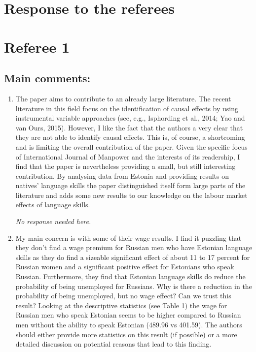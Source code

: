 \documentclass{article}
\newenvironment{response}
{\slshape}{}
\begin{document}
\section*{Response to the referees}

\section{Referee 1}

\subsection{Main comments:}


\begin{enumerate}
\item The paper aims to contribute to an already large
  literature. The recent literature in this field focus on the
  identification of causal effects by using instrumental variable
  approaches (see, e.g., Isphording et al., 2014; Yao and van Ours,
  2015). However, I like the fact that the authors a very clear that
  they are not able to identify causal effects. This is, of course, a
  shortcoming and is limiting the overall contribution of the
  paper. Given the specific focus of International Journal of Manpower
  and the interests of its readership, I find that the paper is
  nevertheless providing a small, but still interesting
  contribution. By analysing data from Estonia and providing results
  on natives’ language skills the paper distinguished itself form
  large parts of the literature and adds some new results to our
  knowledge on the labour market effects of language skills.

  \begin{response}
    No response needed here.
  \end{response}

\item 
  My main concern is with some of their wage results. I find it
  puzzling that they don’t find a wage premium for Russian men who
  have Estonian language skills as they do find a sizeable significant
  effect of about 11 to 17 percent for Russian women and a significant
  positive effect for Estonians who speak Russian. Furthermore, they
  find that Estonian language skills do reduce the probability of
  being unemployed for Russians. Why is there a reduction in the
  probability of being unemployed, but no wage effect? Can we trust
  this result? Looking at the descriptive statistics (see Table 1) the
  wage for Russian men who speak Estonian seems to be higher compared
  to Russian men without the ability to speak Estonian (489.96 vs
  401.59). The authors should either provide more statistics on this
  result (if possible) or a more detailed discussion on potential
  reasons that lead to this finding.


\end{enumerate}
\end{document}
